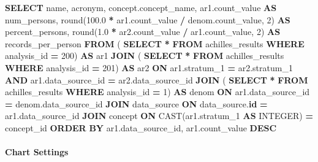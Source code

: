 \documentclass[
]{book}
\newenvironment{Shaded}{\begin{snugshade}}{\end{snugshade}}
\newcommand{\DataTypeTok}[1]{\textcolor[rgb]{0.13,0.29,0.53}{#1}}
\newcommand{\DecValTok}[1]{\textcolor[rgb]{0.00,0.00,0.81}{#1}}
\newcommand{\FloatTok}[1]{\textcolor[rgb]{0.00,0.00,0.81}{#1}}
\newcommand{\FunctionTok}[1]{\textcolor[rgb]{0.00,0.00,0.00}{#1}}
\newcommand{\KeywordTok}[1]{\textcolor[rgb]{0.13,0.29,0.53}{\textbf{#1}}}
\newcommand{\NormalTok}[1]{#1}
\newcommand{\OperatorTok}[1]{\textcolor[rgb]{0.81,0.36,0.00}{\textbf{#1}}}
\begin{document}
\begin{Shaded}
\begin{Highlighting}[]
\KeywordTok{SELECT}
\NormalTok{  name,}
\NormalTok{  acronym,}
\NormalTok{  concept.concept\_name,}
\NormalTok{  ar1.count\_value }\KeywordTok{AS}\NormalTok{ num\_persons,}
  \FunctionTok{round}\NormalTok{(}\FloatTok{100.0} \OperatorTok{*}\NormalTok{ ar1.count\_value }\OperatorTok{/}\NormalTok{ denom.count\_value, }\DecValTok{2}\NormalTok{) }\KeywordTok{AS}\NormalTok{ percent\_persons,}
  \FunctionTok{round}\NormalTok{(}\FloatTok{1.0} \OperatorTok{*}\NormalTok{ ar2.count\_value }\OperatorTok{/}\NormalTok{ ar1.count\_value, }\DecValTok{2}\NormalTok{) }\KeywordTok{AS}\NormalTok{ records\_per\_person}
\KeywordTok{FROM}\NormalTok{ (}
  \KeywordTok{SELECT} \OperatorTok{*}
  \KeywordTok{FROM}\NormalTok{ achilles\_results }\KeywordTok{WHERE}\NormalTok{ analysis\_id }\OperatorTok{=} \DecValTok{200}\NormalTok{) }\KeywordTok{AS}\NormalTok{ ar1}
  \KeywordTok{JOIN}\NormalTok{ (}
    \KeywordTok{SELECT} \OperatorTok{*}
    \KeywordTok{FROM}\NormalTok{ achilles\_results }\KeywordTok{WHERE}\NormalTok{ analysis\_id }\OperatorTok{=} \DecValTok{201}\NormalTok{) }\KeywordTok{AS}\NormalTok{ ar2}
    \KeywordTok{ON}\NormalTok{ ar1.stratum\_1 }\OperatorTok{=}\NormalTok{ ar2.stratum\_1 }\KeywordTok{AND}\NormalTok{ ar1.data\_source\_id }\OperatorTok{=}\NormalTok{ ar2.data\_source\_id}
  \KeywordTok{JOIN}\NormalTok{ (}
    \KeywordTok{SELECT} \OperatorTok{*}
    \KeywordTok{FROM}\NormalTok{ achilles\_results }\KeywordTok{WHERE}\NormalTok{ analysis\_id }\OperatorTok{=} \DecValTok{1}\NormalTok{) }\KeywordTok{AS}\NormalTok{ denom}
    \KeywordTok{ON}\NormalTok{ ar1.data\_source\_id }\OperatorTok{=}\NormalTok{ denom.data\_source\_id}
  \KeywordTok{JOIN}\NormalTok{ data\_source }\KeywordTok{ON}\NormalTok{ data\_source.}\KeywordTok{id} \OperatorTok{=}\NormalTok{ ar1.data\_source\_id}
  \KeywordTok{JOIN}\NormalTok{ concept }\KeywordTok{ON} \FunctionTok{CAST}\NormalTok{(ar1.stratum\_1 }\KeywordTok{AS} \DataTypeTok{INTEGER}\NormalTok{) }\OperatorTok{=}\NormalTok{ concept\_id}
\KeywordTok{ORDER} \KeywordTok{BY}\NormalTok{ ar1.data\_source\_id, ar1.count\_value }\KeywordTok{DESC}
\end{Highlighting}
\end{Shaded}

\hypertarget{chart-settings-7}{%
\paragraph*{Chart Settings}\label{chart-settings-7}}
\end{document}

